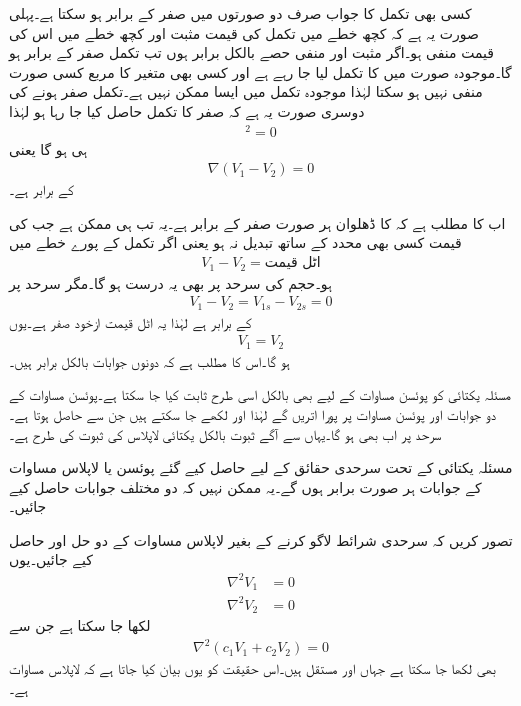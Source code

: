 کسی بھی تکمل کا جواب صرف دو صورتوں میں صفر کے برابر ہو سکتا ہے۔پہلی صورت یہ ہے کہ کچھ خطے میں تکمل کی قیمت مثبت اور کچھ خطے میں اس کی قیمت منفی ہو۔اگر مثبت اور منفی حصے بالکل برابر ہوں تب تکمل صفر کے برابر ہو گا۔موجودہ صورت میں  کا تکمل لیا جا رہے ہے اور کسی بھی متغیر کا مربع کسی صورت منفی نہیں ہو سکتا لہٰذا موجودہ تکمل میں ایسا ممکن نہیں ہے۔تکمل صفر ہونے کی دوسری صورت یہ ہے کہ صفر کا تکمل حاصل کیا جا رہا ہو لہٰذا
\begin{align*}
[\nabla(V_1-V_2)]^2 =0
\end{align*}
ہی ہو گا یعنی
\begin{align*}
\nabla (V_1-V_2)=0
\end{align*}
کے برابر ہے۔

اب  کا مطلب ہے کہ  کا ڈھلوان ہر صورت صفر کے برابر ہے۔یہ تب ہی ممکن ہے جب  کی قیمت کسی بھی محدد کے ساتھ تبدیل نہ ہو یعنی اگر تکمل کے پورے خطے میں
\begin{align*}
V_1-V_2=\text{اٹل قیمت}
\end{align*}
ہو۔حجم کی سرحد پر بھی یہ درست ہو گا۔مگر سرحد پر
\begin{align*}
V_1-V_2=V_{1s}-V_{2s}=0
\end{align*}
کے برابر ہے لہٰذا یہ اٹل قیمت ازخود صفر ہے۔یوں
\begin{align}
V_1=V_2
\end{align}
ہو گا۔اس کا مطلب  ہے کہ دونوں جوابات بالکل برابر ہیں۔

مسئلہ یکتائی کو پوئسن مساوات کے لیے بھی بالکل اسی طرح ثابت کیا جا سکتا ہے۔پوئسن مساوات کے دو جوابات  اور  پوئسن مساوات پر پورا اتریں گے لہٰذا  اور  لکھے جا سکتے ہیں جن سے  حاصل ہوتا ہے۔سرحد پر اب بھی  ہو گا۔یہاں سے آگے ثبوت بالکل یکتائی لاپلاس کی ثبوت کی طرح ہے۔

مسئلہ یکتائی کے تحت سرحدی حقائق کے لیے حاصل کیے  گئے پوئسن یا لاپلاس مساوات کے جوابات ہر صورت برابر ہوں گے۔یہ ممکن نہیں کہ دو مختلف جوابات حاصل کیے جائیں۔ 

تصور کریں کہ سرحدی شرائط لاگو کرنے  کے بغیر لاپلاس مساوات کے دو حل  اور  حاصل کیے جائیں۔یوں
\begin{align*}
\nabla^2 V_1&=0\\
\nabla^2 V_2&=0
\end{align*}
لکھا جا سکتا ہے جن سے
\begin{align*}
\nabla^2 (c_1 V_1 + c_2 V_2)=0 
\end{align*}
بھی لکھا جا سکتا ہے جہاں  اور  مستقل ہیں۔اس حقیقت کو یوں بیان کیا جاتا ہے کہ لاپلاس مساوات  ہے۔


